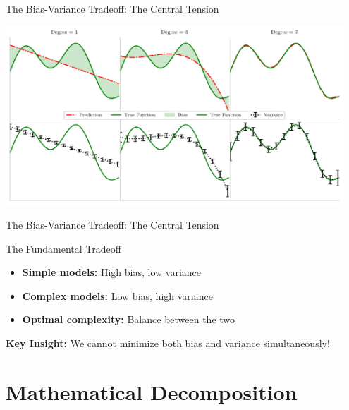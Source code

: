 \documentclass[10pt]{beamer}
\newcommand{\fitpic}[1]{\begin{adjustbox}{max width=\linewidth, max totalheight=0.78\textheight}#1\end{adjustbox}}
\begin{document}
\begin{frame}{The Bias-Variance Tradeoff: The Central Tension}
\begin{center}
\fitpic{\includegraphics[width=0.95\textwidth]{../assets/bias-variance/figures/bv-2_latexify.pdf}}
\end{center}
\end{frame}
\begin{frame}{The Bias-Variance Tradeoff: The Central Tension}
\begin{alertbox}{The Fundamental Tradeoff}
\begin{itemize}
\item \textbf{Simple models:} High bias, low variance
\item \textbf{Complex models:} Low bias, high variance
\item \textbf{Optimal complexity:} Balance between the two
\end{itemize}
\end{alertbox}

\begin{keypointsbox}
\textbf{Key Insight:} We cannot minimize both bias and variance simultaneously!
\end{keypointsbox}
\end{frame}


\section{Mathematical Decomposition}
\end{document}
